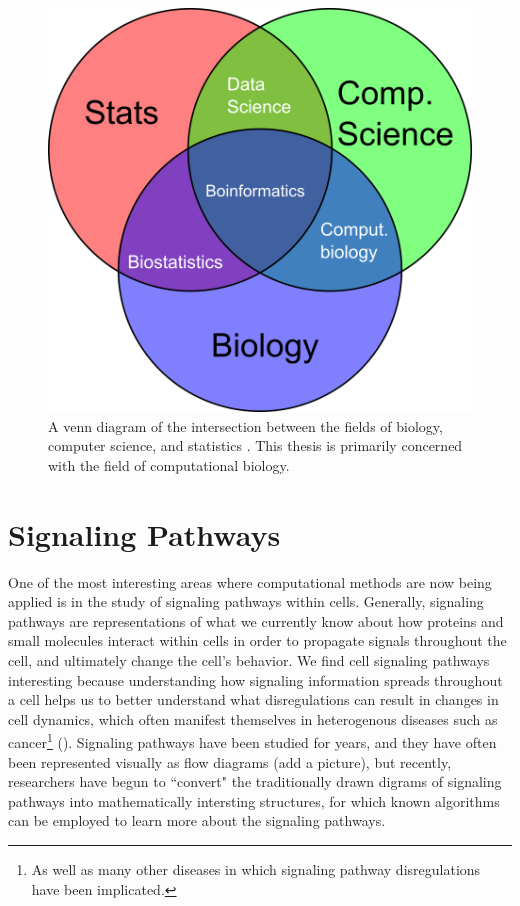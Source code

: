 \documentclass[12pt,twoside]{reedthesis}
\theoremstyle{definition}
\begin{document}
 \begin{figure}[h]
   \begin{center}
     \includegraphics[width=\textwidth/2]{bioinformatics_venn}
   \caption[Bioinformatic fields.]{A venn diagram of the intersection between the fields of biology, computer science, and statistics {\cite{putIntoBib}}. This thesis is primarily concerned with the field of computational biology.}
   \label{fig:bioinf_venn}
   \end{center}
 \end{figure}

 \section{Signaling Pathways}

 One of the most interesting areas where computational methods are now being applied is in the study of signaling pathways within cells. Generally, signaling pathways are representations of what we currently know about how proteins and small molecules interact within cells in order to propagate signals throughout the cell, and ultimately change the cell's behavior. We find cell signaling pathways interesting because understanding how signaling information spreads throughout a cell helps us to better understand what disregulations can result in changes in cell dynamics, which often manifest themselves in heterogenous diseases such as cancer\footnote{As well as many other diseases in which signaling pathway disregulations have been implicated.} (\cite{cancer}). Signaling pathways have been studied for years, and they have often been represented visually as flow diagrams (add a picture), but recently, researchers have begun to ``convert" the traditionally drawn digrams of signaling pathways into mathematically intersting structures, for which known algorithms can be employed to learn more about the signaling pathways.
\end{document}

